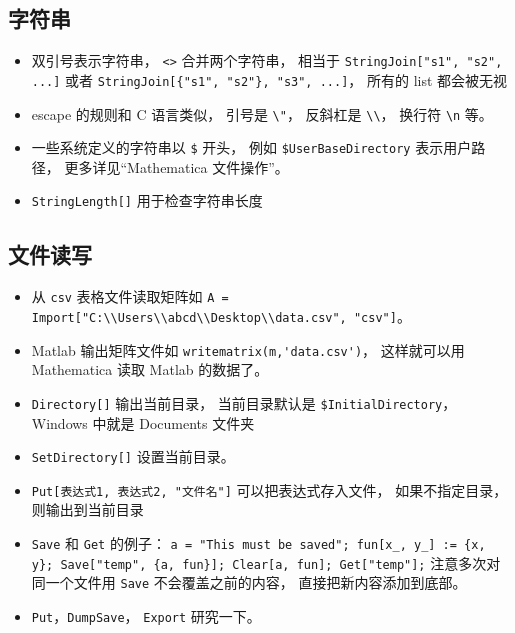 \subsection{字符串}
\begin{itemize}
\item 双引号表示字符串， \verb|<>| 合并两个字符串， 相当于 \verb|StringJoin["s1", "s2", ...]| 或者 \verb|StringJoin[{"s1", "s2"}, "s3", ...]|， 所有的 list 都会被无视
\item escape 的规则和 C 语言类似， 引号是 \verb|\"|， 反斜杠是 \verb|\\|， 换行符 \verb|\n| 等。
\item 一些系统定义的字符串以 \verb|$| 开头， 例如 \verb|$UserBaseDirectory| 表示用户路径， 更多详见“Mathematica 文件操作”。
\item \verb|StringLength[]| 用于检查字符串长度
\end{itemize}

\subsection{文件读写}
\begin{itemize}
\item 从 \verb|csv| 表格文件读取矩阵如 \verb|A = Import["C:\\Users\\abcd\\Desktop\\data.csv", "csv"]|。
\item Matlab 输出矩阵文件如 \verb|writematrix(m,'data.csv')|， 这样就可以用 Mathematica 读取 Matlab 的数据了。
\item \verb|Directory[]| 输出当前目录， 当前目录默认是 \verb|$InitialDirectory|， Windows 中就是 Documents 文件夹
\item \verb|SetDirectory[]| 设置当前目录。
\item \verb|Put[表达式1, 表达式2, "文件名"]| 可以把表达式存入文件， 如果不指定目录， 则输出到当前目录
\item \verb|Save| 和 \verb|Get| 的例子： \verb|a = "This must be saved"; fun[x_, y_] := {x, y}; Save["temp", {a, fun}]; Clear[a, fun]; Get["temp"];| 注意多次对同一个文件用 \verb|Save| 不会覆盖之前的内容， 直接把新内容添加到底部。
\item \verb|Put|，\verb|DumpSave|， \verb|Export| 研究一下。
\end{itemize}
